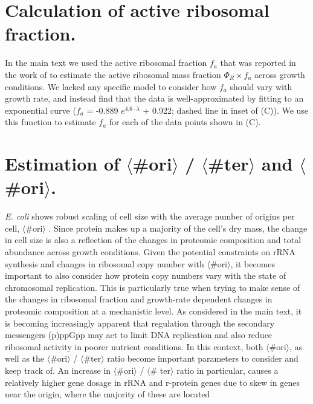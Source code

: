 
\section{Calculation of active ribosomal fraction.}
\label{sec:SI_f_a}
In the main text we used the active ribosomal fraction $f_a$ that was reported
in the work of \cite{dai2016} to estimate the active ribosomal mass fraction
$\Phi_R \times f_a$ across growth conditions. We lacked any specific model to
consider how  $f_a$ should vary with growth rate, and instead find that the data
is well-approximated by fitting to an exponential curve ($f_a$ = -0.889 $e^{4.6
\cdot \lambda}$ + 0.922; dashed line in inset of (C)). We
use this function to estimate $f_a$ for each of the data points shown in
(C).

\section{Estimation of $\langle$\#ori$\rangle$ / $\langle$\#ter$\rangle$ and $\langle$\#ori$\rangle$.}
\label{sec:SI_ori}
\textit{E. coli} shows robust scaling of cell size with the average number
of origins per cell, $\langle$\#ori$\rangle$ \citep{si2017}. Since protein makes
up a majority of the cell's dry mass, the change in cell size is also a
reflection of the changes in proteomic composition and total abundance across
growth conditions. Given the potential constraints on rRNA synthesis and changes
in ribosomal copy number with $\langle$\#ori$\rangle$, it becomes important to
also consider how protein copy numbers vary with the state of chromosomal
replication. This is particularly true  when trying to make sense of the changes
in ribosomal fraction and growth-rate dependent changes in proteomic composition
at a  mechanistic level.  As considered in the main text, it is becoming
increasingly apparent that regulation through the secondary messengers (p)ppGpp
may act to limit DNA replication and also reduce ribosomal activity in poorer
nutrient conditions.  In this context, both $\langle$\#ori$\rangle$, as well as
the $\langle$\#ori$\rangle$ / $\langle$\#ter$\rangle$ ratio become important
parameters to consider and keep track of. An increase in $\langle$\#ori$\rangle$
/ $\langle$\# ter$\rangle$ ratio  in particular, causes a relatively higher gene
dosage in rRNA and r-protein genes due to skew in genes near the origin, where
the majority of these are located

